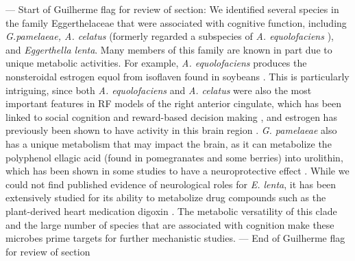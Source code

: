 \documentclass{article}
\begin{document}
--- Start of Guilherme flag for review of section:
We identified several species in the family Eggerthelaceae that were
associated with cognitive function, including \emph{G.pamelaeae, A. celatus}
(formerly regarded a subspecies of \emph{A. equolofaciens}
\cite{takahashiCompleteGenomeSequence2021}),
and \emph{Eggerthella lenta}. Many members of this family are
known in part due to unique metabolic activities. For example, \emph{A.
equolofaciens} produces the nonsteroidal estrogen equol from isoflaven
found in soybeans \cite{wangEnantioselectiveSynthesisSEquol2005}.
This is particularly intriguing, since both \emph{A. equolofaciens} and \emph{A. celatus}
were also the most important features in RF models of the
right anterior cingulate, which has been linked to social cognition
and reward-based decision making \cite{appsAnteriorCingulateGyrus2016,boesRightAnteriorCingulate2008,bushDorsalAnteriorCingulate2002},
and estrogen has previously been shown to have activity 
in this brain region \cite{xiaoEstrogenAnteriorCingulate2013}.
\emph{G. pamelaeae} also has a unique metabolism that may impact the brain,
as it can metabolize the polyphenol ellagic acid
(found in pomegranates and some berries) into urolithin, which has been
shown in some studies to have a neuroprotective effect
\cite{gongUrolithinAlleviatesBloodbrain2022,selmaDescriptionUrolithinProduction2014}.
While we could not find published evidence of neurological roles for \emph{E. lenta},
it has been extensively studied for
its ability to metabolize drug compounds such as the plant-derived heart
medication digoxin \cite{haiserPredictingManipulatingCardiac2013}.
The metabolic versatility of this clade and the large number of
species that are associated with cognition make these microbes prime
targets for further mechanistic studies.
--- End of Guilherme flag for review of section
\end{document}
